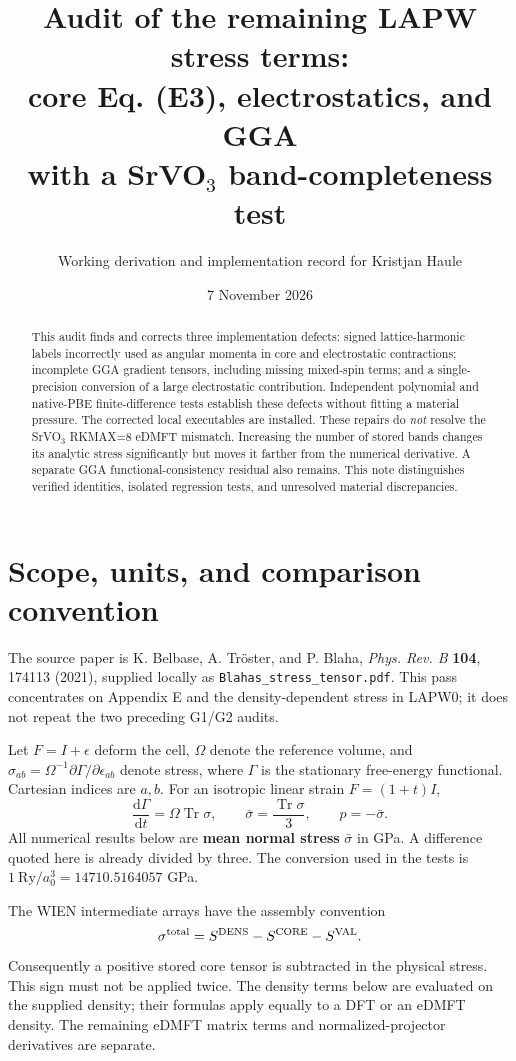 \documentclass[11pt]{article}
\title{Audit of the remaining LAPW stress terms:\\core Eq. (E3), electrostatics, and GGA\\with a SrVO$_3$ band-completeness test}
\author{Working derivation and implementation record for Kristjan Haule}
\date{7 November 2026}
\newcommand{\Tr}{\operatorname{Tr}}
\newcommand{\dd}{\mathrm d}
\begin{document}
\maketitle
\begin{abstract}
This audit finds and corrects three implementation defects: signed lattice-harmonic labels incorrectly used as angular momenta in core and electrostatic contractions; incomplete GGA gradient tensors, including missing mixed-spin terms; and a single-precision conversion of a large electrostatic contribution. Independent polynomial and native-PBE finite-difference tests establish these defects without fitting a material pressure. The corrected local executables are installed. These repairs do \emph{not} resolve the SrVO$_3$ RKMAX=8 eDMFT mismatch. Increasing the number of stored bands changes its analytic stress significantly but moves it farther from the numerical derivative. A separate GGA functional-consistency residual also remains. This note distinguishes verified identities, isolated regression tests, and unresolved material discrepancies.
\end{abstract}
\tableofcontents
\clearpage

\section{Scope, units, and comparison convention}
The source paper is K. Belbase, A. Tr\"oster, and P. Blaha, \emph{Phys. Rev. B} \textbf{104}, 174113 (2021), supplied locally as \nolinkurl{Blahas_stress_tensor.pdf}. This pass concentrates on Appendix E and the density-dependent stress in LAPW0; it does not repeat the two preceding G1/G2 audits.

Let $F=I+\epsilon$ deform the cell, $\Omega$ denote the reference volume, and $\sigma_{ab}=\Omega^{-1}\partial\Gamma/\partial\epsilon_{ab}$ denote stress, where $\Gamma$ is the stationary free-energy functional. Cartesian indices are $a,b$. For an isotropic linear strain $F=(1+t)I$,
\begin{equation}
 \frac{\dd\Gamma}{\dd t}=\Omega\Tr\sigma,\qquad
 \bar\sigma=\frac{\Tr\sigma}{3},\qquad p=-\bar\sigma.
\end{equation}
All numerical results below are \textbf{mean normal stress} $\bar\sigma$ in GPa. A difference quoted here is already divided by three. The conversion used in the tests is $1\ \mathrm{Ry}/a_0^3=14710.5164057$ GPa.

The WIEN intermediate arrays have the assembly convention
\begin{equation}
 \sigma^{\rm total}=S^{\rm DENS}-S^{\rm CORE}-S^{\rm VAL}.
\end{equation}
Consequently a positive stored core tensor is subtracted in the physical stress. This sign must not be applied twice. The density terms below are evaluated on the supplied density; their formulas apply equally to a DFT or an eDMFT density. The remaining eDMFT matrix terms and normalized-projector derivatives are separate.
\end{document}
